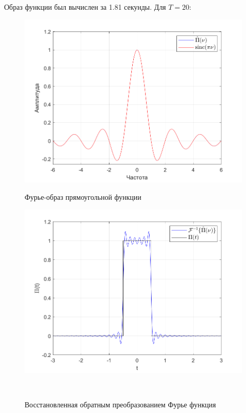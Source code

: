 \documentclass[a4paper]{article}
\begin{document}
Образ функции был вычислен за 1.81 секунды. Для $T = 20$:

\begin{figure}[H]
    \begin{minipage}{0.5\textwidth}
        \centering \includegraphics[width=\textwidth]{graphs/1/T_20_dt_0.001_V_12_dv_0.001/fourier_numerical.png}
        \caption{Фурье-образ прямоугольной функции}
    \end{minipage}\hfill
    \begin{minipage}{0.5\textwidth}
        \centering \includegraphics[width=\textwidth]{graphs/1/T_20_dt_0.001_V_12_dv_0.001/func_inversed_fourier.png}
        \caption{Восстановленная обратным преобразованием Фурье функция}
    \end{minipage}\\[1em]
\end{figure}\noindent\
\end{document}
